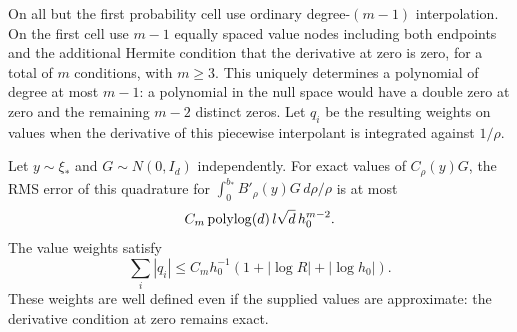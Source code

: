 On all but the first probability cell use ordinary degree-$(m-1)$
interpolation.  On the first cell use $m-1$ equally spaced value nodes
including both endpoints and the additional Hermite condition that the derivative
at zero is zero, for a total of $m$ conditions, with $m\ge3$.
This uniquely determines a polynomial of degree at most $m-1$: a
polynomial in the null space would have a double zero at zero and the
remaining $m-2$ distinct zeros.  Let $q_i$ be the resulting weights on
values when the derivative of this piecewise interpolant is integrated
against $1/\rho$.

\begin{lemma}
\label{lem:kernel-endpoint-quadrature}
Let $y\sim\xi_*$ and $G\sim N(0,I_d)$ independently.
For exact values of $C_\rho(y)G$, the RMS error of this quadrature for
$\int_0^{b_*}B'_\rho(y)G\,d\rho/\rho$ is at most
\[
 C_m\operatorname{polylog}(d)\,l\sqrt d\,h_0^{m-2}.
\]
The value weights satisfy
\begin{equation}\label{eq:kernel-weight-sum}
 \sum_i|q_i|
 \le C_mh_0^{-1}(1+|\log R|+|\log h_0|).
\end{equation}
These weights are well defined even if the supplied values are
approximate: the derivative condition at zero remains exact.
\end{lemma}

